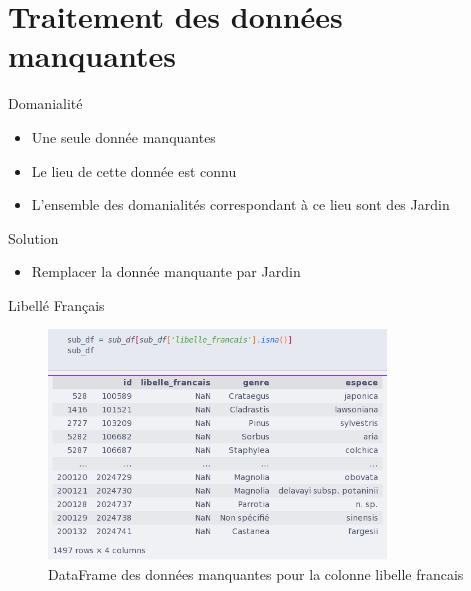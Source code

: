 \documentclass{beamer}
\begin{document}
\section{Traitement des données manquantes}
\begin{frame}{Domanialité}
	\begin{itemize}
		\item<1-> Une seule donnée manquantes
		\item<2-> Le \alert{lieu} de cette donnée est connu
		\item<3-> L'ensemble des \alert{domanialités} correspondant à ce \alert{lieu} sont des \alert{Jardin}
	\end{itemize}
	\pause
	\pause
	\pause
	{
	\begin{block}{Solution}
		\begin{itemize}
			\item Remplacer la donnée manquante par \alert{Jardin}
		\end{itemize}
	\end{block}
	}
\end{frame}
\begin{frame}{Libellé Français}
	\begin{figure}
		\includegraphics[width=0.8\textwidth,keepaspectratio]{ressources/df_libfr(1).png}
			\caption{DataFrame des données manquantes pour la colonne libelle francais}
	\end{figure}
\end{frame}
\end{document}
